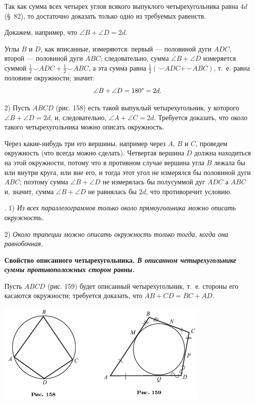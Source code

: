 \documentclass[oneside]{book}
\begin{document}
Так как сумма всех четырех углов всякого выпуклого четырехугольника равна $4d$ (§~82), то достаточно доказать только одно из требуемых равенств.

Докажем, например, что $\angle B+\angle D = 2d$.

Углы $B$ и $D$, как вписанные, измеряются:
первый — половиной дуги $ADC$, второй — половиной дуги $ABC$;
следовательно, сумма $\angle B+\angle D$ измеряется суммой $\tfrac12{\smallsmile}ADC + \tfrac12{\smallsmile}ABC$, а эта сумма равна $\tfrac12({\smallsmile}ADC+{\smallsmile}ABC)$, т.~е.
равна половине окружности;
значит:
\[\angle B+\angle D=180\degree = 2d.\]

2) Пусть $ABCD$ (рис. 158) есть такой выпуклый четырехугольник, у которого $\angle B+\angle D = 2d$, и, следовательно, $\angle A + \angle C = 2d$.
Требуется доказать, что около такого четырехугольника можно описать окружность.

Через какие-нибудь три его вершины, например через $A$, $B$ и $C$, проведем окружность (что всегда можно сделать).
Четвертая вершина $D$ должна находиться на этой окружности, потому что в противном случае вершина угла $B$ лежала бы или внутри круга, или вне его, и тогда этот угол не измерялся бы половиной дуги $ABC$;
поэтому сумма $\angle B+\angle D$ не измерялась бы полусуммой дуг $ADC$ а $ABC$ и, значит, сумма $\angle B+\angle D$ не равнялась бы $2d$, что противоречит условию.

.
1) \emph{Из всех параллелограммов только около прямоугольника можно описать окружность.}

2) \emph{Около трапеции можно описать окружность только тогда, когда она равнобочная.}

\textbf{Свойство описанного четырехугольника.
\emph{В описанном четырехугольнике суммы противоположных сторон равны.}}

Пусть $ABCD$ (рис. 159) будет описанный четырехугольник, т.~е. стороны его касаются окружности;
требуется доказать, что $AB+CD=BC+AD$.

\includegraphics{pics/ris-158-159}
\end{document}
